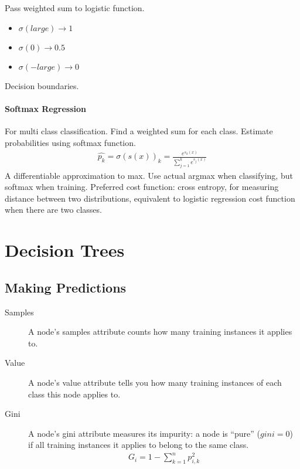 \documentclass[10pt]{article}
\begin{document}
  Pass weighted sum to logistic function.
  \begin{itemize}
    \item $\sigma(large)\rightarrow 1$
    \item $\sigma(0)\rightarrow 0.5$
    \item $\sigma(-large)\rightarrow 0$
  \end{itemize}

  Decision boundaries.

  \paragraph{Softmax Regression}%
  \label{par:softmax_regression}

  For multi class classification. Find a weighted sum for each class. Estimate
  probabilities using softmax function.
  \begin{align}
    \hat{p_k}=\sigma(s(x))_k=\frac{e^{s_k(x)}}{\sum_{j=1}^{k}e^{s_j(x)}}
  \end{align}
  A differentiable approximation to max. Use actual argmax when classifying, but
  softmax when training. Preferred cost function: cross entropy, for measuring
  distance between two distributions, equivalent to logistic regression cost
  function when there are two classes.

  \section{Decision Trees}%
  \label{sec:decision_trees}

  \subsection{Making Predictions}%
  \label{sub:making_predictions}

  \begin{description}
    \item[Samples] A node's samples attribute counts how many training instances it
      applies to.
    \item[Value] A node's value attribute tells you how many training instances
      of each class this node applies to.
    \item[Gini] A node's gini attribute measures its impurity: a node is
      ``pure'' ($gini=0$) if all training instances it applies to belong to the
      same class.
      \begin{align}
        G_i=1-\sum_{k=1}^{n}p_{i,k}^2
      \end{align}
  \end{description}
\end{document}
